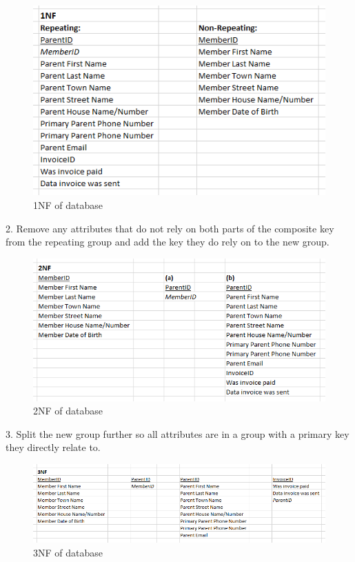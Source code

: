 \begin{figure}[H]
\includegraphics[width=\textwidth]{./Design/images/1NF.png}
    \caption{1NF of database} \label{fig:UNF}
\end{figure}

2. Remove any attributes that do not rely on both parts of the composite key from the repeating group and add the key they do rely on to the new group.

\begin{figure}[H]
\includegraphics[width=\textwidth]{./Design/images/2NF.png}
    \caption{2NF of database} \label{fig:UNF}
\end{figure}

3. Split the new group further so all attributes are in a group with a primary key they directly relate to.

\begin{figure}[H]
\includegraphics[width=\textwidth]{./Design/images/3NF.png}
    \caption{3NF of database} \label{fig:UNF}
\end{figure}

